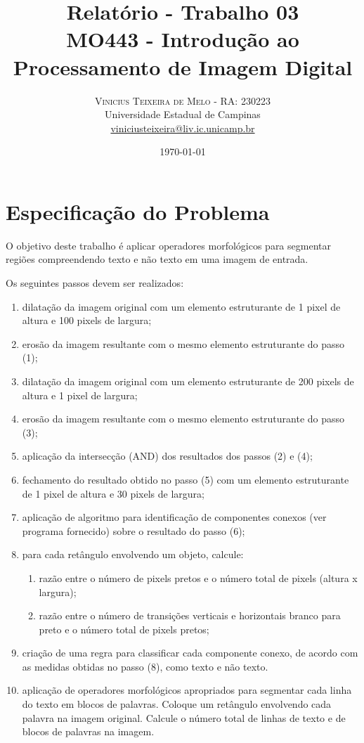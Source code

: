\documentclass[twoside,twocolumn]{article}
\title{Relatório - Trabalho 03 \\ \Large MO443 - Introdução ao Processamento de Imagem Digital} %
\author{%
\textsc{Vinicius Teixeira de Melo - RA: 230223} \\[1ex] %
\normalsize Universidade Estadual de Campinas \\ %
\normalsize \href{mailto:viniciusteixeira@liv.ic.unicamp.br}{viniciusteixeira@liv.ic.unicamp.br} %
}
\date{\today} %
\begin{document}
\maketitle


\section{Especificação do Problema}

O objetivo deste trabalho é aplicar operadores morfológicos para segmentar regiões compreendendo texto e
não texto em uma imagem de entrada.

Os seguintes passos devem ser realizados:

\begin{enumerate}
	\item dilatação da imagem original com um elemento estruturante de 1 pixel de altura e 100 pixels de largura;
	\item erosão da imagem resultante com o mesmo elemento estruturante do passo (1);
	\item dilatação da imagem original com um elemento estruturante de 200 pixels de altura e 1 pixel de largura;
	\item erosão da imagem resultante com o mesmo elemento estruturante do passo (3);
	\item aplicação da intersecção (AND) dos resultados dos passos (2) e (4);
	\item fechamento do resultado obtido no passo (5) com um elemento estruturante de 1 pixel de altura e 30
pixels de largura;
	\item aplicação de algoritmo para identificação de componentes conexos (ver programa fornecido) sobre o
resultado do passo (6);
	\item para cada retângulo envolvendo um objeto, calcule:
	\begin{enumerate}
		\item razão entre o número de pixels pretos e o número total de pixels (altura x largura);
		\item razão entre o número de transições verticais e horizontais branco para preto e o número total de pixels pretos;
	\end{enumerate}
	\item criação de uma regra para classificar cada componente conexo, de acordo com as medidas obtidas no
passo (8), como texto e não texto.
	\item aplicação de operadores morfológicos apropriados para segmentar cada linha do texto em blocos de palavras. Coloque um retângulo envolvendo cada palavra na imagem original. Calcule o número total de linhas de texto e de blocos de palavras na imagem.
\end{enumerate}
\end{document}

